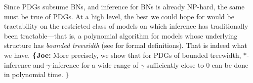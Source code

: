 \documentclass[twoside]{article}
\newcommand\vjoe[1]{{\color{joecolor}\textbf{$\boldsymbol\{$Joe: }#1 \textbf{$\boldsymbol\}$}}}
\begin{document}


Since PDGs subsume BNs, and 
inference for BNs is already NP-hard, the same must be true of 
PDGs.
At a high level, the best we could hope for would be tractability on the restricted
class of models on which inference has traditionally been tractable---that is, a polynomial algorithm for models whose
underlying structure has \emph{bounded treewidth} (see
 for formal definitions).
That is indeed what we have.  
\vjoe{More precisely, we show that for PDGs of
bounded treewidth,
$*$-inference
and $\gamma$-inference for a wide
range of $\gamma$ sufficiently close to 0 can be done in polynomial time.}
\end{document}
